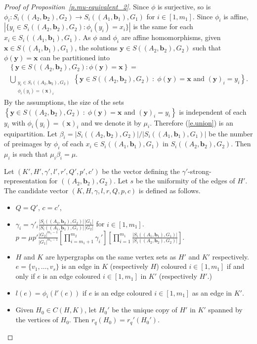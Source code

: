 \documentclass[10pt]{article}
\begin{document}
\begin{proof}[Proof of Proposition~\ref{p.mu-equivalent_2}]
	Since $\phi$ is surjective, so is $\phi_i:S_i((A_2,\mathbf{b}_2),G_2)\to S_i((A_1,\mathbf{b}_1),G_1)$ for $i\in[1,m_1]$. 
	Since $\phi_i$ is affine, $|\{y_i\in S_i((A_2,\mathbf{b}_2),G_2) : \phi_i(y_i)=x_i\}|$ is the same for each $x_i\in S_i((A_1,\mathbf{b}_1),G_1)$. As $\phi$ and $\phi_i$ are affine homomorphisms, given $\mathbf{x}\in S((A_1,\mathbf{b}_1),G_1)$, the solutions $\mathbf{y}\in S((A_2,\mathbf{b}_2),G_2)$ such that $\phi(\mathbf{y})=\mathbf{x}$ can be partitioned into
	\begin{multline} \label{e.union}
		\left\{\mathbf{y}\in S((A_2,\mathbf{b}_2),G_2) : \phi(\mathbf{y})=\mathbf{x}\right\}= \\ \bigcup_{\substack{y_i \in S_i((A_2,\mathbf{b}_2),G_2)\\ \phi_i(y_i)=(\mathbf{x})_i}} \left\{\mathbf{y}\in S((A_2,\mathbf{b}_2),G_2)\; :\; \phi(\mathbf{y})=\mathbf{x} \text{ and } (\mathbf{y})_i=y_i \right\}.
\end{multline}
By the assumptions, the size of the sets $\left\{\mathbf{y}\in S((A_2,\mathbf{b}_2),G_2)\; :\; \phi(\mathbf{y})=\mathbf{x} \text{ and } (\mathbf{y})_i=y_i  \right\}$ is independent of each $y_i$ with $\phi_i(y_i)=(\mathbf{x})_i$ and we denote it by $\mu_i$. Therefore (\ref{e.union}) is an equipartition.
	Let $\beta_i=|S_i((A_2,\mathbf{b}_2),G_2)|/|S_i((A_1,\mathbf{b}_1),G_1)|$ be the number of preimages by $\phi_i$ of each $x_i\in S_i((A_1,\mathbf{b}_1),G_1)$ in $S_i((A_2,\mathbf{b}_2),G_2)$. Then $\mu_i$ is such that $\mu_i\beta_i=\mu$.
	
	
	Let $(K',H',\gamma',l',r',Q',p',c')$ be the vector defining the $\gamma'$-strong-representation for $((A_2,\mathbf{b}_2),G_2)$. Let $s$ be the uniformity of the edges of $H'$. The candidate vector $(K,H,\gamma,l,r,Q,p,c)$ 
	is defined as follows.
	\begin{itemize}
		\item $Q=Q'$, 
		$c=c'$, 
		\item 
		$\gamma_i=\gamma'_i \frac{|S_i((A_2,\mathbf{b}_2),G_2)|}{|S_i((A_1,\mathbf{b}_1),G_1)|}\frac{|G_1|}{|G_2|}$ for $i\in[1,m_1]$. $p=\mu p'\frac{|G_2|^{m_1-1}}{|G_1|^{m_1-1}}\left[\prod_{i=m_1+1}^{m_2}\gamma_i'\right] \left[\prod_{i=1}^{m_1} \frac{|S_i((A_1,\mathbf{b}_1),G_1)|}{|S_i((A_2,\mathbf{b}_2),G_2)|}\right]$.

\item $H$ and $K$ are hypergraphs on the same vertex sets as $H'$ and $K'$ respectively. $e=\{v_1,\ldots,v_s\}$ is an edge in $K$ (respectively $H$) coloured $i\in[1,m_1]$ if and only if $e$ is an edge coloured $i\in[1,m_1]$ in $K'$ (respectively $H'$.)
			\item $l(e)=\phi_i(l'(e))$ if $e$ is an edge coloured $i\in[1,m_1]$ as an edge in $K'$.
		\item Given $H_0\in C(H,K)$, let $H_0'$ be the unique copy of $H'$ in $K'$ spanned by the vertices of $H_0$. Then $r_q(H_0)=r_q'(H_0')$.	\end{itemize}
	

\end{proof}
\end{document}
